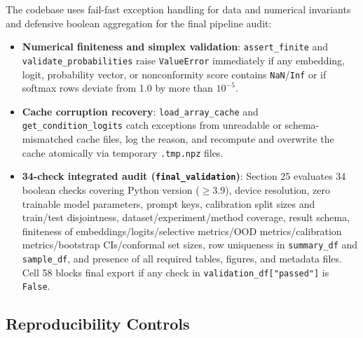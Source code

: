 \documentclass[11pt,a4paper]{article}
\begin{document}
The codebase uses fail-fast exception handling for data and numerical invariants and defensive boolean aggregation for the final pipeline audit:
\begin{itemize}
  \item \textbf{Numerical finiteness and simplex validation}: \texttt{assert\_\allowbreak{}finite} and \texttt{validate\_\allowbreak{}probabilities} raise \texttt{ValueError} immediately if any embedding, logit, probability vector, or nonconformity score contains \texttt{NaN}/\texttt{Inf} or if softmax rows deviate from 1.0 by more than $10^{-5}$.
  \item \textbf{Cache corruption recovery}: \texttt{load\_\allowbreak{}array\_\allowbreak{}cache} and \texttt{get\_\allowbreak{}condition\_\allowbreak{}logits} catch exceptions from unreadable or schema-mismatched cache files, log the reason, and recompute and overwrite the cache atomically via temporary \texttt{.\allowbreak{}tmp.\allowbreak{}npz} files.
  \item \textbf{34-check integrated audit (\texttt{final\_\allowbreak{}validation})}: Section 25 evaluates 34 boolean checks covering Python version ($\ge 3.9$), device resolution, zero trainable model parameters, prompt keys, calibration split sizes and train/test disjointness, dataset/experiment/method coverage, result schema, finiteness of embeddings/logits/selective metrics/OOD metrics/calibration metrics/bootstrap CIs/conformal set sizes, row uniqueness in \texttt{summary\_\allowbreak{}df} and \texttt{sample\_\allowbreak{}df}, and presence of all required tables, figures, and metadata files. Cell 58 blocks final export if any check in \texttt{validation\_\allowbreak{}df["passed"]} is \texttt{False}.
\end{itemize}

\subsection{Reproducibility Controls}
\end{document}
